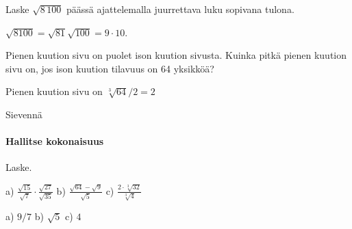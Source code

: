 \begin{tehtavasivu}
\begin{tehtava}
Laske $\sqrt{8\,100}$ päässä ajattelemalla juurrettava luku sopivana tulona.
\begin{vastaus}
$\sqrt{8100}=\sqrt{81}\sqrt{100}=9\cdot 10$.
\end{vastaus}
\end{tehtava}

\begin{tehtava}
Pienen kuution sivu on puolet ison kuution sivusta. Kuinka pitkä pienen kuution sivu on, jos ison kuution tilavuus on 64 yksikköä? \\
\begin{vastaus}
Pienen kuution sivu on $\sqrt[3]{64}/2=2$ 
\end{vastaus}
\end{tehtava}

\begin{tehtava}
 Sievennä
	\begin{alakohdat}
	\end{alakohdat}
	  \begin{vastaus}
		\begin{alakohdat}
		 \alakohta{$\sqrt{3}$}
		 \alakohta{$\sqrt[3]{2}$}
		 \alakohta{${\sqrt[60]{42}}^{11}$}
		\end{alakohdat}
	\end{vastaus}
\end{tehtava}


\paragraph*{Hallitse kokonaisuus}

Laske.

\begin{tehtava}
a) $ \frac{\sqrt{15}}{\sqrt{7}} \cdot  \frac{\sqrt{27}}{\sqrt{35}}$  \quad b)  $ \frac{\sqrt{64}-\sqrt{9}}{\sqrt{5}}$   \quad c)  $ \frac{2 \cdot \sqrt[3]{32}}{\sqrt[3]{4}}$ \quad 
\begin{vastaus}
a) $9/7$ \quad b) $\sqrt{5}$ \quad c) $4$ \quad
\end{vastaus}
\end{tehtava}


\end{tehtavasivu}
